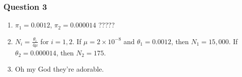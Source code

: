 \documentclass{article}
\begin{document}
        \subsubsection*{Question 3}
            \begin{enumerate}[\bf\ \ A)]
                \item $\pi_1 = 0.0012$, $\pi_2 = 0.000014$ ?????
                \item $N_i = \frac{\theta_i}{4\mu}$ for $i = 1,2$.  If $\mu = 2\times10^{-8}$ and $\theta_1 = 0.0012$, then $N_1 = 15,000$.  If $\theta_2 = 0.000014$, then $N_2 = 175$.
                \item Oh my God they're adorable.
            \end{enumerate}
\end{document}
